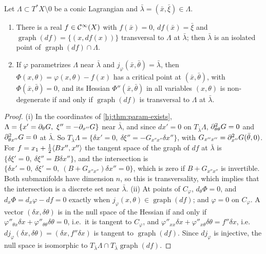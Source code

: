 \begin{lemma}\label{hj:lem:test-phase}
  Let $\Lambda\subset T^*X\setminus0$ be a conic Lagrangian and
  $\bar\lambda=(\bar x,\bar\xi)\in\Lambda$.
  \begin{enumerate}[label=(\roman*)]
  \item There is a real $f\in\mathcal{C}^\infty(X)$ with $f(\bar x)=0$, $df(\bar x)=\bar\xi$ and
    $\operatorname{graph}(df)=\{(x,df(x))\}$ transversal to $\Lambda$ at
    $\bar\lambda$; then $\bar\lambda$ is an isolated point of
    $\operatorname{graph}(df)\cap\Lambda$.
  \item If $\varphi$ parametrizes $\Lambda$ near $\bar\lambda$ and
    $j_\varphi(\bar x,\bar\theta)=\bar\lambda$, then
    $\Phi(x,\theta)=\varphi(x,\theta)-f(x)$ has a critical point at $(\bar
    x,\bar\theta)$, with $\Phi(\bar x,\bar\theta)=0$, and its Hessian
    $\Phi''(\bar x,\bar\theta)$ in all variables $(x,\theta)$ is non-degenerate if
    and only if $\operatorname{graph}(df)$ is transversal to $\Lambda$ at
    $\bar\lambda$.
  \end{enumerate}
\end{lemma}
\begin{proof}
  (i) In the coordinates of \cref{hj:thm:param-exists},
  $\Lambda=\{x'=\pa_\theta G,\ \xi''=-\pa_{x''}G\}$ near $\bar\lambda$, and
  since $dx'=0$ on $T_{\bar\lambda}\Lambda$, $\partial^2_{\theta\theta}G=0$ and
  $\partial^2_{\theta x''}G=0$ at $\bar\lambda$.  So
  $T_{\bar\lambda}\Lambda=\{\delta x'=0,\ \delta\xi''=-G_{x''x''}\delta x''\}$, with
  $G_{x''x''}=\partial_{x''}^2G(\bar\theta,0)$.  For $f=x_1+\frac12\langle Bx'',x''\rangle$ the
  tangent space of the graph of $df$ at $\bar\lambda$ is
  $\{\delta\xi'=0,\ \delta\xi''=B\delta x''\}$, and the intersection is
  $\{\delta x'=0,\ \delta\xi'=0,\ (B+G_{x''x''})\delta x''=0\}$, which is zero if
  $B+G_{x''x''}$ is invertible.  Both submanifolds have dimension $n$, so this is
  transversality, which implies that the intersection is a discrete set near
  $\bar\lambda$.
  (ii) At points of $C_\varphi$, $d_\theta\Phi=0$, and $d_x\Phi=d_x\varphi-df=0$
  exactly when $j_\varphi(x,\theta)\in\operatorname{graph}(df)$; and $\varphi=0$ on
  $C_\varphi$.  A vector $(\delta x,\delta\theta)$ is in the null space of the
  Hessian if and only if $\varphi''_{\theta x}\delta x+\varphi''_{\theta\theta}
  \delta\theta=0$, i.e.\ it is tangent to $C_\varphi$, and $\varphi''_{xx}\delta
  x+\varphi''_{x\theta}\delta\theta=f''\delta x$, i.e.\
  $dj_\varphi(\delta x,\delta\theta)=(\delta x,f''\delta x)$ is tangent to
  $\operatorname{graph}(df)$.  Since $dj_\varphi$ is injective, the null space is
  isomorphic to $T_{\bar\lambda}\Lambda\cap T_{\bar\lambda}\operatorname{graph}(df)$.
\end{proof}


